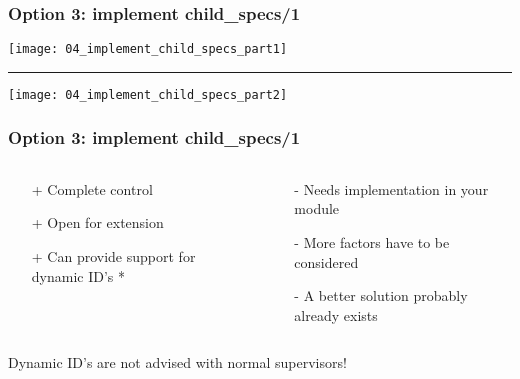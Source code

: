 \begin{frame}
    \frametitle{Option 3: implement child\_specs/1}
    \texttt{[image: 04\_implement\_child\_specs\_part1]}
    \vskip2mm
    \hrule
    \vskip2mm
    \texttt{[image: 04\_implement\_child\_specs\_part2]}
\end{frame}

\begin{frame}
    \frametitle{Option 3: implement child\_specs/1}
    \begin{columns}

        \begin{column}{0.5\textwidth}
            \begin{itemize}
                \item[+] Complete control
                \item[+] Open for extension
                \item[+] Can provide support for dynamic ID's *
            \end{itemize}
        \end{column}

        \begin{column}{0.5\textwidth}
            \begin{itemize}
                \item[-] Needs implementation in your module
                \item[-] More factors have to be considered
                \item[-] A better solution probably already exists
            \end{itemize}
        \end{column}
    \end{columns}
    \vfill
    \footnotesize * Dynamic ID's are not advised with normal supervisors!
\end{frame}